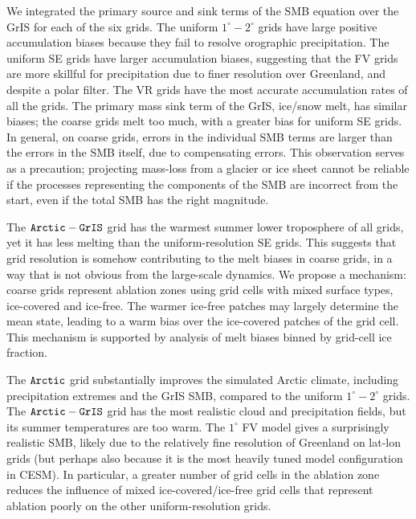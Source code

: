 \documentclass[draft]{agujournal2019}
\begin{document}
We integrated the primary source and sink terms of the SMB equation over the GrIS for each of the six grids. The uniform $1^{\circ}-2^{\circ}$ grids have large positive accumulation biases because they fail to resolve orographic precipitation. The uniform SE grids have larger accumulation biases, suggesting that the FV grids are more skillful for precipitation due to finer resolution over Greenland, and despite a polar filter. The VR grids have the most accurate accumulation rates of all the grids. The primary mass sink term of the GrIS, ice/snow melt, has similar biases; the coarse grids melt too much, with a greater bias for uniform SE grids. In general, on coarse grids, errors in the individual SMB terms are larger than the errors in the SMB itself, due to compensating errors. This observation serves as a precaution; projecting mass-loss from a glacier or ice sheet cannot be reliable if the processes representing the components of the SMB are incorrect from the start, even if the total SMB has the right magnitude.

The $\tt Arctic-GrIS$ grid has the warmest summer lower troposphere of all grids, yet it has less melting than the uniform-resolution SE grids. This suggests that grid resolution is somehow contributing to the melt biases in coarse grids, in a way that is not obvious from the large-scale dynamics. We propose a mechanism: coarse grids represent ablation zones using grid cells with mixed surface types, ice-covered and ice-free. The warmer ice-free patches may largely determine the mean state, leading to a warm bias over the ice-covered patches of the grid cell. This mechanism is supported by analysis of melt biases binned by grid-cell ice fraction.

The $\tt Arctic$ grid substantially improves the simulated Arctic climate, including precipitation extremes and the GrIS SMB, compared to the uniform $1^{\circ}-2^{\circ}$ grids. The $\tt Arctic-GrIS$ grid has the most realistic cloud and precipitation fields, but its summer temperatures are too warm. The $1^{\circ}$ FV model gives a surprisingly realistic SMB, likely due to the relatively fine resolution of Greenland on lat-lon grids (but perhaps also because it is the most heavily tuned model configuration in CESM). In particular, a greater number of grid cells in the ablation zone reduces the influence of mixed ice-covered/ice-free grid cells that represent ablation poorly on the other uniform-resolution grids.
\end{document}
